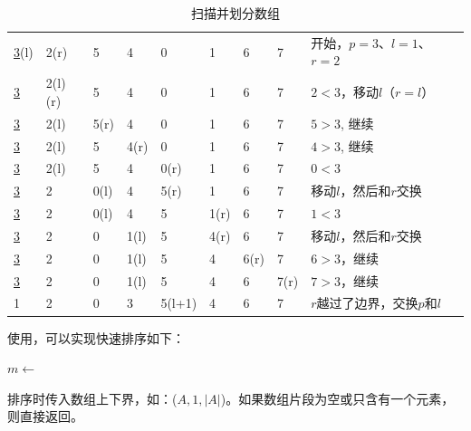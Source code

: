 \documentclass[b5paper]{ctexart}
\begin{document}
\begin{table}[htbp]
\centering
\begin{tabular}{|llllllll|l|}
\hline
\underline{3}(l)  & 2(r) & 5 & 4 & 0 & 1 & 6 & 7 & 开始，$p = 3$、$l = 1$、$r = 2$ \\
\underline{3} & 2(l)(r) & 5 & 4 & 0 & 1 & 6 & 7 & $2 < 3$，移动$l$（$r=l$）\\
\underline{3} & 2(l) & 5(r) & 4 & 0 & 1 & 6 & 7 & $5 > 3$, 继续 \\
\underline{3} & 2(l) & 5 & 4(r) & 0 & 1 & 6 & 7 & $4 > 3$, 继续 \\
\underline{3} & 2(l) & 5 & 4 & 0(r) & 1 & 6 & 7 & $0 < 3$ \\
\underline{3} & 2 & 0(l) & 4 & 5(r) & 1 & 6 & 7 & 移动$l$，然后和$r$交换 \\
\underline{3} & 2 & 0(l) & 4 & 5 & 1(r) & 6 & 7 & $1 < 3$ \\
\underline{3} & 2 & 0 & 1(l) & 5 & 4(r) & 6 & 7 & 移动$l$，然后和$r$交换 \\
\underline{3} & 2 & 0 & 1(l) & 5 & 4 & 6(r) & 7 & $6 > 3$，继续 \\
\underline{3} & 2 & 0 & 1(l) & 5 & 4 & 6 & 7(r) & $7 > 3$，继续 \\
1 & 2 & 0 & 3 & 5(l+1) & 4 & 6 & 7 & $r$越过了边界，交换$p$和$l$ \\
\hline
\end{tabular}
\caption{扫描并划分数组} \label{tab:partition-steps}
\end{table}

使用，可以实现快速排序如下：

\begin{algorithmic}[1]
    \State $m \gets$ 
    \State {}
    \State {}
  \EndIf
\EndProcedure
\end{algorithmic}

排序时传入数组上下界，如：($A, 1, |A|$)。如果数组片段为空或只含有一个元素，则直接返回。

\begin{Exercise}\label{ex:basic-qsort}
\end{Exercise}

\begin{Answer}[ref = {ex:basic-qsort}]
\end{Answer}
\end{document}
